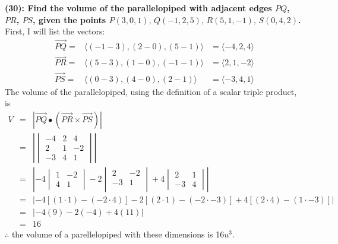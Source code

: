 \documentclass[12]{article}
\begin{document}
\textbf{(30): Find the volume of the parallelopiped with adjacent edges $PQ$, $PR$, $PS$, given the points $P(3,0,1),\, Q(-1,2,5),\, R(5,1,-1),\, S(0,4,2)$.}\\

First, I will list the vectors:
\begin{eqnarray}
\vec{PQ} =& \langle (-1-3),(2-0),(5-1) \rangle &= \langle -4,2,4 \rangle\\
\vec{PR} =& \langle (5-3),(1-0),(-1-1) \rangle &= \langle 2,1,-2 \rangle\\
\vec{PS} =& \langle (0-3),(4-0),(2-1) \rangle &= \langle -3,4,1 \rangle
\end{eqnarray}
The volume of the parallelopiped, using the definition of a scalar triple product, is
\begin{eqnarray}
V &=& |\vec{PQ}\bullet (\vec{PR}\times\vec{PS})|\\
&=& \left| 
	\begin{vmatrix}
	-4& 2& 4\\
	2& 1& -2\\
	-3& 4& 1
	\end{vmatrix}
\right|\\
&=& \left| -4
	\begin{vmatrix}
	1& -2\\
	4& 1
	\end{vmatrix}
	-2\begin{vmatrix}
	2& -2\\
	-3& 1\\
	\end{vmatrix}
	+4\begin{vmatrix}
	2& 1\\
	-3& 4
	\end{vmatrix}
\right|\\
&=& \left|
-4[(1\cdot 1)-(-2\cdot 4)] - 2[(2\cdot 1)-(-2\cdot -3)] + 4[(2\cdot 4)-(1\cdot -3)]
\right|\\
&=& |-4(9) - 2(-4) + 4(11)|\\
&=& 16
\end{eqnarray}
$\therefore$ the volume of a parellelopiped with these dimensions is 16$u^3$.
\end{document}
